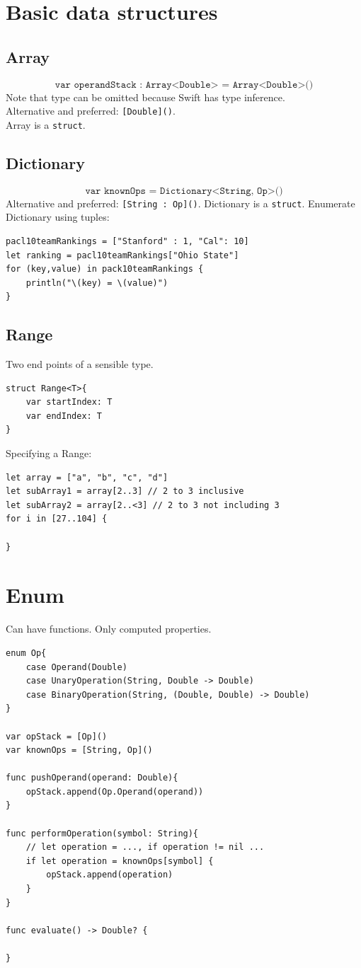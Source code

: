 \documentclass[12pt]{report}
\newcommand{\co}{\texttt}
\begin{document}
\section{Basic data structures}
\subsection{Array}
$$\co{var operandStack : Array<Double> = Array<Double>()} $$
Note that type can be omitted because Swift has type inference.\\
Alternative and preferred: \co{[Double]()}. \\
Array is a \co{struct}.

\subsection{Dictionary}
$$\co{var knownOps = Dictionary<String, Op>()}$$
Alternative and preferred: \co{[String : Op]()}. 
Dictionary is a \co{struct}. Enumerate Dictionary using tuples:
\begin{lstlisting}
pacl10teamRankings = ["Stanford" : 1, "Cal": 10]
let ranking = pacl10teamRankings["Ohio State"]
for (key,value) in pack10teamRankings {
	println("\(key) = \(value)")
}
\end{lstlisting}

\subsection{Range}
Two end points of a sensible type.
\begin{lstlisting}
struct Range<T>{
	var startIndex: T
	var endIndex: T
}
\end{lstlisting}
Specifying a Range:
\begin{lstlisting}
let array = ["a", "b", "c", "d"]
let subArray1 = array[2..3] // 2 to 3 inclusive
let subArray2 = array[2..<3] // 2 to 3 not including 3
for i in [27..104] {

}
\end{lstlisting}

\section{Enum}
Can have functions. Only computed properties.
\begin{lstlisting}
enum Op{
	case Operand(Double)
	case UnaryOperation(String, Double -> Double)
	case BinaryOperation(String, (Double, Double) -> Double)
}

var opStack = [Op]()
var knownOps = [String, Op]()

func pushOperand(operand: Double){
	opStack.append(Op.Operand(operand))
}

func performOperation(symbol: String){
	// let operation = ..., if operation != nil ... 
	if let operation = knownOps[symbol] { 
		opStack.append(operation)
	}
}

func evaluate() -> Double? {
	
}
\end{lstlisting}
\end{document}
